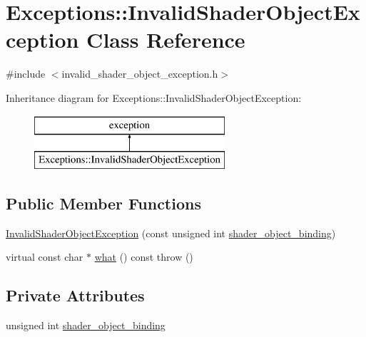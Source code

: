 \hypertarget{class_exceptions_1_1_invalid_shader_object_exception}{}\section{Exceptions\+:\+:Invalid\+Shader\+Object\+Exception Class Reference}
\label{class_exceptions_1_1_invalid_shader_object_exception}


{\ttfamily \#include $<$invalid\+\_\+shader\+\_\+object\+\_\+exception.\+h$>$}

Inheritance diagram for Exceptions\+:\+:Invalid\+Shader\+Object\+Exception\+:\begin{figure}[H]
\begin{center}
\leavevmode
\includegraphics[height=2.000000cm]{class_exceptions_1_1_invalid_shader_object_exception}
\end{center}
\end{figure}
\subsection*{Public Member Functions}
\begin{DoxyCompactItemize}
\item 
\hyperlink{class_exceptions_1_1_invalid_shader_object_exception_a7de090bec61f4d09e95a6286a96e9f25}{Invalid\+Shader\+Object\+Exception} (const unsigned int \hyperlink{class_exceptions_1_1_invalid_shader_object_exception_a80365b85ba22f19254ea8e04cd0454e0}{shader\+\_\+object\+\_\+binding})
\item 
virtual const char $\ast$ \hyperlink{class_exceptions_1_1_invalid_shader_object_exception_a31caa1597313fbe9e166146b266087b0}{what} () const   throw ()
\end{DoxyCompactItemize}
\subsection*{Private Attributes}
\begin{DoxyCompactItemize}
\item 
unsigned int \hyperlink{class_exceptions_1_1_invalid_shader_object_exception_a80365b85ba22f19254ea8e04cd0454e0}{shader\+\_\+object\+\_\+binding}
\end{DoxyCompactItemize}


